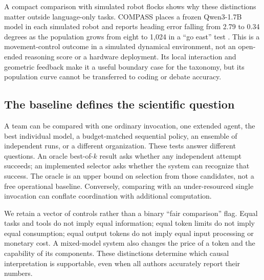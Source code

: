 A compact comparison with simulated robot flocks shows why these distinctions matter outside language-only tasks. COMPASS places a frozen Qwen3-1.7B model in each simulated robot and reports heading error falling from 2.79 to 0.34 degrees as the population grows from eight to 1,024 in a ``go east'' test \citep{compass-kilo-flocks}. This is a movement-control outcome in a simulated dynamical environment, not an open-ended reasoning score or a hardware deployment. Its local interaction and geometric feedback make it a useful boundary case for the taxonomy, but its population curve cannot be transferred to coding or debate accuracy.

\subsection{The baseline defines the scientific question}
A team can be compared with one ordinary invocation, one extended agent, the best individual model, a budget-matched sequential policy, an ensemble of independent runs, or a different organization. These tests answer different questions. An oracle best-of-$k$ result asks whether any independent attempt succeeds; an implemented selector asks whether the system can recognize that success. The oracle is an upper bound on selection from those candidates, not a free operational baseline. Conversely, comparing with an under-resourced single invocation can conflate coordination with additional computation.

We retain a vector of controls rather than a binary ``fair comparison'' flag. Equal tasks and tools do not imply equal information; equal token limits do not imply equal consumption; equal output tokens do not imply equal input processing or monetary cost. A mixed-model system also changes the price of a token and the capability of its components. These distinctions determine which causal interpretation is supportable, even when all authors accurately report their numbers.
